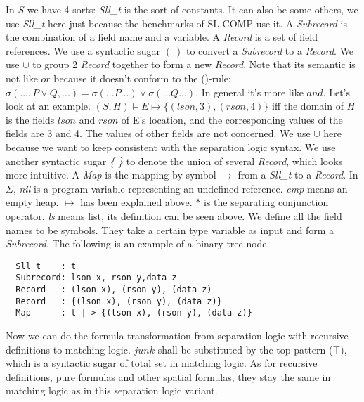 \documentclass{article}
\theoremstyle{plain}
\begin{document}
In $S$ we have 4 sorts: \textit{Sll\_t} is the sort of constants. It can also be some others, we use \textit{Sll\_t} here just because the benchmarks of SL-COMP use it. A \textit{Subrecord} is the combination of a field name and a variable. A \textit{Record} is a set of field references. We use a syntactic sugar $\mathit{(\ )}$ to convert a \textit{Subrecord} to a \textit{Record}. We use $\cup$ to group 2 \textit{Record} together to form a new \textit{Record}. Note that its semantic is not like $or$ because it doesn't conform to the (\vee)-rule: $\sigma (...,P\vee Q,...)=\sigma(...P...)\vee\sigma(...Q...)$. In general it's more like $and$. Let's look at an example. $(S,H) \models E \mapsto \{(lson,3),(rson,4)\}$ iff the domain of $H$ is the fields $lson$ and $rson$ of E's location, and the corresponding values of the fields are 3 and 4. The values of other fields are not concerned. We use $\cup$ here because we want to keep consistent with the separation logic syntax. We use another syntactic sugar \textit{\{ \}} to denote the union of several \textit{Record}, which looks more intuitive. A \textit{Map} is the mapping by symbol $\mapsto$ from a \textit{Sll\_t} to a \textit{Record}. In $\Sigma$, \textit{nil} is a program variable representing an undefined reference. \textit{emp} means an empty heap. $\mapsto$ has been explained above. $*$ is the separating conjunction operator. \textit{ls} means list, its definition can be seen above. We define all the field names to be symbols. They take a certain type variable as input and form a \textit{Subrecord}. The following is an example of a binary tree node.
\begin{verbatim}
  Sll_t    : t
  Subrecord: lson x, rson y,data z
  Record   : (lson x), (rson y), (data z)
  Record   : {(lson x), (rson y), (data z)}
  Map      : t |-> {(lson x), (rson y), (data z)}   
\end{verbatim}

Now we can do the formula transformation from separation logic with recursive definitions to matching logic. $junk$ shall be substituted by the top pattern ($\top$), which is a syntactic sugar of total set in matching logic. As for recursive definitions, pure formulas and other spatial formulas, they stay the same in matching logic as in this separation logic variant.
\begin{comment}
\begin{algorithm}
	\KwIn{a separation logic pattern $P$}
	\KwOut{a matching logic formula}
    \Switch{the pattern $P$}{
      \uCase{$\Pi$}
            {\Return{$\Pi$} \;}
      \uCase{$junk$}
            {\Return{$true$} \;}
      \uCase{$\Sigma$}
            {\Return{$\Sigma$} \;}
      \uCase{$\exists x . Q$}
            {\Return{$\exists x . Q$} \;}
      \uCase{$\Pi \wedge \mathtt{tobool}(\Sigma) \wedge \Delta$}
            {\Return{$\Pi \wedge \Sigma \wedge \Delta$ \;}}
    }
	\caption{The separation logic to matching logic  transformation}
\end{algorithm}
\end{comment}
\end{document}
